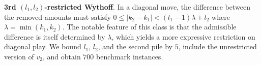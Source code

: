 \documentclass[review]{elsarticle}
\newcommand{\set}[1]{\{ #1 \}}
\newcommand{\tuple}[1]{\langle {#1} \rangle}
\newcommand{\true}{\top}
\newcommand{\statevar}{\mathcal{X}}
\newcommand{\act}{\mathcal{A}}
\newcommand{\constraint}{\mathcal{C}}
\newcommand{\estate}{\mathcal{E}}
\newcommand{\pre}{\mathtt{pre}}
\newcommand{\eff}{\mathtt{eff}}
\begin{document}
\textbf{3rd $(l_1,l_2)$-restricted Wythoff}. In a diagonal move, the difference between the removed amounts must satisfy $0 \le |k_2-k_1| < (l_1-1)\lambda + l_2$ where $\lambda = \min(k_1,k_2)$.
The notable feature of this class is that the admissible difference is itself determined by $\lambda$, which yields a more expressive restriction on diagonal play.
We bound $l_1$, $l_2$, and the second pile by $5$, include the unrestricted version of $v_2$, and obtain $700$ benchmark instances.
\end{document}
